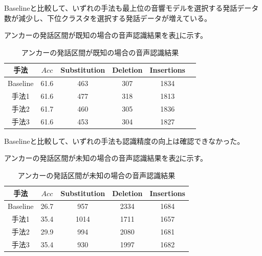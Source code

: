 Baselineと比較して、いずれの手法も最上位の音響モデルを選択する発話データ数が減少し、下位クラスタを選択する発話データが増えている。\\

\par
アンカーの発話区間が既知の場合の音声認識結果を表\ref{table:result_sprecog1}に示す。

\begin{table}[H]
  \begin{center}
    \caption{アンカーの発話区間が既知の場合の音声認識結果 \label{table:result_sprecog1}}
    \begin{tabular}{|c||c|c|c|c|c|} \hline
     手法  & $Acc$ & Substitution & Deletion & Insertions \\ \hline
     Baseline  & 61.6 & 463 & 307 & 1834 \\ \hline
     手法1  & 61.6 & 477 & 318 & 1813 \\ \hline
     手法2  & 61.7 & 460 & 305 & 1836 \\ \hline
     手法3  & 61.6 & 453 & 304 & 1827 \\ \hline
    \end{tabular}
  \end{center}
\end{table}

Baselineと比較して、いずれの手法も認識精度の向上は確認できなかった。

\vspace{0.2in}  \par
アンカーの発話区間が未知の場合の音声認識結果を表\ref{table:result_sprecog2}に示す。

\begin{table}[H]
  \begin{center}
    \caption{アンカーの発話区間が未知の場合の音声認識結果 \label{table:result_sprecog2}}
    \begin{tabular}{|c||c|c|c|c|} \hline
     手法  & $Acc$ & Substitution & Deletion & Insertions \\ \hline
     Baseline & 26.7 & 957 & 2334 & 1684 \\ \hline
     手法1  & 35.4 & 1014 & 1711 & 1657 \\ \hline
     手法2  & 29.9 & 994 & 2080  & 1681 \\ \hline  
     手法3  & 35.4 & 930 & 1997 & 1682 \\ \hline
    \end{tabular}
  \end{center}
\end{table}

